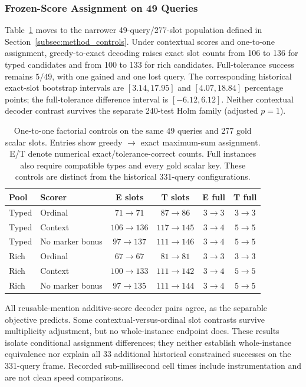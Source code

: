\documentclass[pdflatex,iicol,sn-basic,Numbered]{sn-jnl}
\begin{document}
\subsubsection{Frozen-Score Assignment on 49 Queries}
\label{subsec:grounding-followup}
Table~\ref{tab:grounding-factorial-diagnostic} moves to the narrower 49-query/277-slot population defined in Section~\ref{subsec:method_controls}. Under contextual scores and one-to-one assignment, greedy-to-exact decoding raises exact slot counts from 106 to 136 for typed candidates and from 100 to 133 for rich candidates. Full-tolerance success remains $5/49$, with one gained and one lost query. The corresponding historical exact-slot bootstrap intervals are $[3.14,17.95]$ and $[4.07,18.84]$ percentage points; the full-tolerance difference interval is $[-6.12,6.12]$. Neither contextual decoder contrast survives the separate 240-test Holm family (adjusted $p=1$).

\begin{table}[t]
\centering
\caption{One-to-one factorial controls on the same 49 queries and 277 gold
scalar slots. Entries show greedy $\rightarrow$ exact maximum-sum assignment.
E/T denote numerical exact/tolerance-correct counts. Full instances also
require compatible types and every gold scalar key. These controls are
distinct from the historical 331-query configurations.}
\label{tab:grounding-factorial-diagnostic}
\small
\setlength{\tabcolsep}{3pt}
\begin{tabular}{@{}llcccc@{}}
\toprule
Pool & Scorer & E slots & T slots & E full & T full\\
\midrule
Typed & Ordinal & $71\to71$ & $87\to86$ & $3\to3$ & $3\to3$\\
Typed & Context & $106\to136$ & $117\to145$ & $3\to4$ & $5\to5$\\
Typed & No marker bonus & $97\to137$ & $111\to146$ & $3\to4$ & $5\to5$\\
Rich & Ordinal & $67\to67$ & $81\to81$ & $3\to3$ & $3\to3$\\
Rich & Context & $100\to133$ & $111\to142$ & $3\to4$ & $5\to5$\\
Rich & No marker bonus & $97\to135$ & $111\to144$ & $3\to4$ & $5\to5$\\
\bottomrule
\end{tabular}
\end{table}

All reusable-mention additive-score decoder pairs agree, as the separable objective predicts. Some contextual-versus-ordinal slot contrasts survive multiplicity adjustment, but no whole-instance endpoint does. These results isolate conditional assignment differences; they neither establish whole-instance equivalence nor explain all 33 additional historical constrained successes on the 331-query frame. Recorded sub-millisecond cell times include instrumentation and are not clean speed comparisons.
\end{document}
